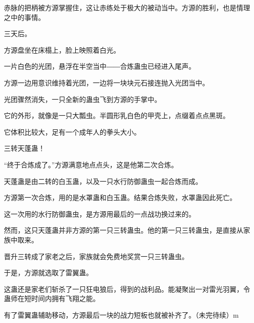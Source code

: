 \begin{this_body}
赤脉的把柄被方源掌握住，这让赤练处于极大的被动当中。方源的胜利，也是情理之中的事情。

三天后。

方源盘坐在床榻上，脸上映照着白光。

一片白色的光团，悬浮在半空当中――合炼蛊虫已经进入尾声。

方源一边用意识维持着光团，一边将一块块元石接连抛入光团当中。

光团骤然消失，一只全新的蛊虫飞到方源的手掌中。

它的外形，就像是一只大瓢虫。半圆形乳白色的甲壳上，点缀着点点黑斑。

它体积比较大，足有一个成年人的拳头大小。

三转天蓬蛊！

“终于合炼成了。”方源满意地点点头，这是他第二次合炼。

天蓬蛊是由二转的白玉蛊，以及一只水行防御蛊虫一起合炼而成。

方源第一次合炼，用的是水罩蛊和白玉蛊。结果合炼失败，水罩蛊因此死亡。

这一次用的水行防御蛊虫，是方源用最后的一点战功换过来的。

然而，这只天蓬蛊并非方源的第一只三转蛊虫。他的第一只三转蛊虫，是直接从家族中取来。

晋升三转成了家老之后，家族就会免费地奖赏一只三转蛊虫。

于是，方源就选取了雷翼蛊。

这蛊还是家老们斩杀了一只狂电狼后，得到的战利品。能凝聚出一对雷光羽翼，令蛊师在短时间内拥有飞翔之能。

有了雷翼蛊辅助移动，方源最后一块的战力短板也就被补齐了。（未完待续）m

\end{this_body}

